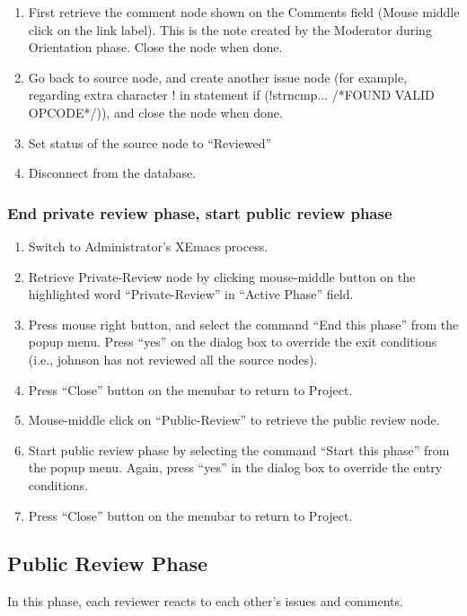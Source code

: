 \begin{enumerate}
\item First retrieve the comment node shown on the Comments field
 (Mouse middle click on the link label).
This is the note created by the Moderator during Orientation phase.
Close the node when done.
\item Go back to source node, and create another issue node (for
example, regarding extra character ! in 
statement if (!strncmp... /*FOUND VALID OPCODE*/)), and close the node
when done. 
\item  Set status of the source node to ``Reviewed''
\item Disconnect from the database.
\end{enumerate}

\subsubsection{End private review phase, start public review phase}

\begin{enumerate}
\item Switch to Administrator's XEmacs process.
\item Retrieve Private-Review node by clicking mouse-middle button
on the highlighted word ``Private-Review'' in ``Active Phase'' field.
\item Press mouse right button, and select the command ``End this
phase'' from the popup menu. Press ``yes'' on the dialog box to
override the exit conditions (i.e., johnson has not reviewed all the
source nodes).
\item Press ``Close'' button on the menubar to return to Project.
\item Mouse-middle click on ``Public-Review'' to retrieve the public review
node.  
\item Start public review phase by selecting the command ``Start this
phase'' from the popup menu. Again, press ``yes'' in the dialog box to
override the entry conditions.  
\item Press ``Close'' button on the menubar to return to Project.
\end{enumerate}


\subsection{Public Review Phase}
In this phase, each reviewer reacts to each other's issues and comments.

